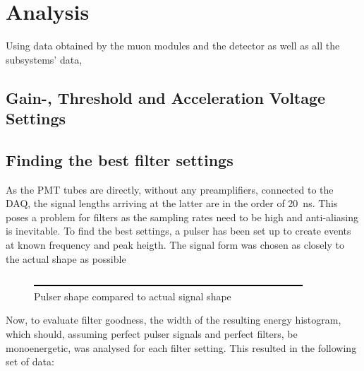 %

\chapter{Analysis}
\label{ch:Analysis}
  Using data obtained by the muon modules and the detector as well as all the subsystems' data, 

  \section{Gain-, Threshold and Acceleration Voltage Settings}
  \label{ch:Analysis:sec:GainsThresholdsAccVoltages}
  
  \section{Finding the best filter settings}
  \label{ch:Analysis:sec:Finding the best filter settings}
  As the PMT tubes are directly, without any preamplifiers, connected to the DAQ, the signal lengths arriving at the latter are in the order of \SI{20}{\nano\second}. This poses a problem for filters as the sampling rates need to be high and anti-aliasing is inevitable. To find the best settings, a pulser has been set up to create events at known frequency and peak heigth. The signal form  was chosen as closely to the actual shape as possible
 
  \begin{figure}
	\caption{Pulser shape compared to actual signal shape}
  	\includegraphics[width = 0.9\textwidth]{graphics/dummy.eps}
  \end{figure}
  
  Now, to evaluate filter goodness, the width of the resulting energy histogram, which should, assuming perfect pulser signals and perfect filters, be monoenergetic, was analysed for each filter setting. This resulted in the following set of data:
  
